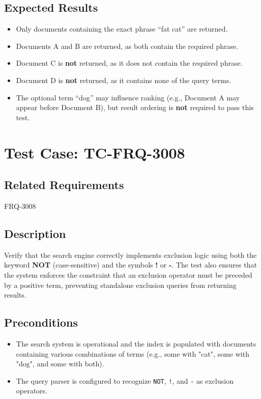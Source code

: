 \documentclass{article}
\begin{document}
\subsection*{Expected Results}
\begin{itemize}
  \item Only documents containing the exact phrase ``fat cat'' are returned.
  \item Documents A and B are returned, as both contain the required phrase.
  \item Document C is \textbf{not} returned, as it does not contain the required phrase.
  \item Document D is \textbf{not} returned, as it contains none of the query terms.
  \item The optional term ``dog'' may influence ranking (e.g., Document A may appear before Document B), but result ordering is \textbf{not} required to pass this test.
\end{itemize}



\section{Test Case: TC-FRQ-3008}
\subsection*{Related Requirements}
FRQ-3008

\subsection*{Description}
Verify that the search engine correctly implements exclusion logic using both the keyword \textbf{NOT}
(case-sensitive) and the symbols \textbf{!} or \textbf{-}. The test also ensures that the system 
enforces the constraint that an exclusion operator must be preceded by a positive term, preventing 
standalone exclusion queries from returning results.

\subsection*{Preconditions}
\begin{itemize}
  \item The search system is operational and the index is populated with documents containing various combinations of terms (e.g., some with "cat", some with "dog", and some with both).
  \item The query parser is configured to recognize \texttt{NOT}, \texttt{!}, and \texttt{-} as exclusion operators.
\end{itemize}
\end{document}
